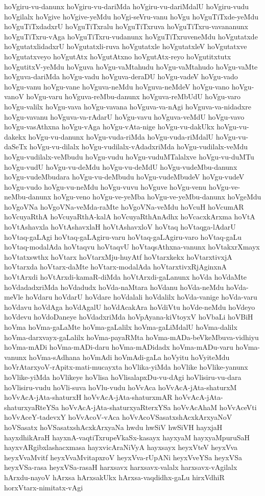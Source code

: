 {hoVgiru-vu-danunx
hoVgiru-vu-dariMda
hoVgiru-vu-dariMdalU
hoVgiru-vudu
hoVgilalx
hoVgive
hoVgive-yeMdu
hoVgi-seVru-vanu
hoVgu
hoVguTiTxde-yeMdu
hoVguTiTxdadxrU
hoVguTiTxralu
hoVguTiTxruva
hoVguTiTxru-vavananunx
hoVguTiTxru-vAga
hoVguTiTxru-vudanunx
hoVguTiTxruveneMdu
hoVgutatxde
hoVgutatxlidadxrU
hoVgutatxli-ruva
hoVgutatxle
hoVgutatxleV
hoVgutatxve
hoVgutatxveyo
hoVgutAtx
hoVgutAtxno
hoVgutAtx-reyo
hoVgutitxtutx
hoVgutitxV-yeMdu
hoVguva
hoVgu-vaMtahudu
hoVgu-vaMtahudo
hoVgu-vaMte
hoVguva-dariMda
hoVgu-vadu
hoVguva-deraDU
hoVgu-vadeV
hoVgu-vado
hoVgu-vanu
hoVgu-vane
hoVguva-neMdu
hoVguva-neMdeV
hoVgu-vano
hoVgu-vanoV
hoVgu-varu
hoVguva-reMbu-danunx
hoVguva-reMbUdU
hoVgu-varo
hoVgu-valilx
hoVgu-vava
hoVgu-vavana
hoVguva-va-nAgi
hoVguva-va-nidadxre
hoVgu-vavanu
hoVguva-va-rAdarU
hoVgu-vavu
hoVguva-veMdU
hoVgu-vavo
hoVgu-vasAthxna
hoVgu-vAga
hoVgu-vAta-nige
hoVgu-vu-dakUkx
hoVgu-vu-dakekx
hoVgu-vu-danunx
hoVgu-vuda-riMda
hoVgu-vuda-riMdalU
hoVgu-vu-daSeTx
hoVgu-vu-dilalx
hoVgu-vudilalx-vAdadxriMda
hoVgu-vudilalx-veMdu
hoVgu-vudilalx-veMbudu
hoVgu-vudu
hoVgu-vuduMTalalxve
hoVgu-vu-duMTu
hoVgu-vudU
hoVgu-vu-deMdu
hoVgu-vu-deMdU
hoVgu-vudeMbu-danunx
hoVgu-vudeMbudara
hoVgu-vu-deMbudu
hoVgu-vudeMbudeV
hoVgu-vudeV
hoVgu-vudo
hoVgu-vu-neMdu
hoVgu-vuvu
hoVguve
hoVgu-venu
hoVgu-ve-neMbu-danunx
hoVgu-veno
hoVgu-ve-yeMba
hoVgu-ve-yeMbu-danunx
hoVgeMdu
hoVgoVNa
hoVgoVNa-veMda-raMte
hoVgoVNa-veMdu
hoVcuH
hoVcumAR
hoVcuyaRthA
hoVcuyaRthA-kalA
hoVcuyaRthAnAdhx
hoVcacxkArxma
hoVtA
hoVtAshavxla
hoVtAshavxlaH
hoVtAshavxloV
hoVtaq
hoVtaqga-lAdarU
hoVtaq-gaLAgi
hoVtaq-gaLAgiru-varu
hoVtaq-gaLAgiru-varo
hoVtaq-gaLu
hoVtaq-modalAda
hoVtaqvu
hoVtaqvU
hoVtaqsAthxna-vanunx
hoVtakxrXmayx
hoVtatxswthx
hoVtarx
hoVtarxMju-huyAtf
hoVtarxkekx
hoVtarxtivxjA
hoVtarxda
hoVtarx-daMte
hoVtarx-modalAda
hoVtarxtivxRjAginxnA
hoVtArxdi
hoVtArxdi-kamaR-diMda
hoVtArxdi-gaLanunx
hoVda
hoVdaMte
hoVdadadxriMda
hoVdadudx
hoVda-naMtara
hoVdanu
hoVda-neMdu
hoVda-meVle
hoVdaru
hoVdarU
hoVdare
hoVdalali
hoVdalilx
hoVda-vanige
hoVda-varu
hoVdavu
hoVdAga
hoVdAgalU
hoVdAcakAra
hoVdiVtu
hoVde-neMdu
hoVdeyo
hoVdevu
hoVdoDaneye
hoVdadxriMda
hoVpAyana-kiVtoyxV
hoVbaLi
hoVBiH
hoVma
hoVma-gaLaMte
hoVma-gaLalilx
hoVma-gaLiMdalU
hoVma-dalilx
hoVma-darxvayx-gaLalilx
hoVma-payaRMta
hoVma-mADa-beVkeMbuva-vidhiyu
hoVma-mADi
hoVma-mADi-daru
hoVma-mADidadx
hoVma-mADu-varu
hoVma-vanunx
hoVma-sAdhana
hoVmAdi
hoVmAdi-gaLa
hoVyitu
hoVyiteMdu
hoVrAtarxyoV-rApitx-mati-mucayxta
hoVlika-yiMda
hoVlike
hoVlike-yanunx
hoVlike-yiMda
hoVlikeye
hoVlisa
hoVlisalapxDu-vu-dAgi
hoVlisiru-vu-dara
hoVlisiru-vudu
hoVli-suva
hoVlu-vudu
hoVvAca
hoVvAcA-jAta-shaturxM
hoVvAcA-jAta-shaturxH
hoVvAcA-jAta-shaturxmAR
hoVvAcA-jAta-shaturxyaRteYSa
hoVvAcA-jAta-shaturxyaRterxYSa
hoVvAcAhaM
hoVvAceVti
hoVvAceY-tadevxY
hoVvAcoV-vAca
hoVvAcoVSasatxshAcxkArxyaNoV
hoVSasatx
hoVSasatxshAcxkArxyaNa
hwdu
hwSiV
hwSiVH
hayxjaH
hayxdhikAraH
hayxnA-vaqtiTxrupeVkaSx-kasayx
hayxyaM
hayxyaMpuruSaH
hayxvARgibxlashacxmasa
hayxvicAraNiVyA
hayxsayx
heyxVteV
heyxVva
heyxVvaMvitf
heyxVvaMvitapxroV
heyxVva-rUpANi
heyxVveYSa
heyxVSa
heyxVSa-rasa
heyxVSa-rasaH
harxsavx
harxsavx-valalx
harxsavx-vAgilalx
hArxdu-nayoV
hArxsa
hArxsakUkx
hArxsa-vaqdidhx-gaLu
hirxVdhiR
horxVtarx-nimitatx-vAgi
}

